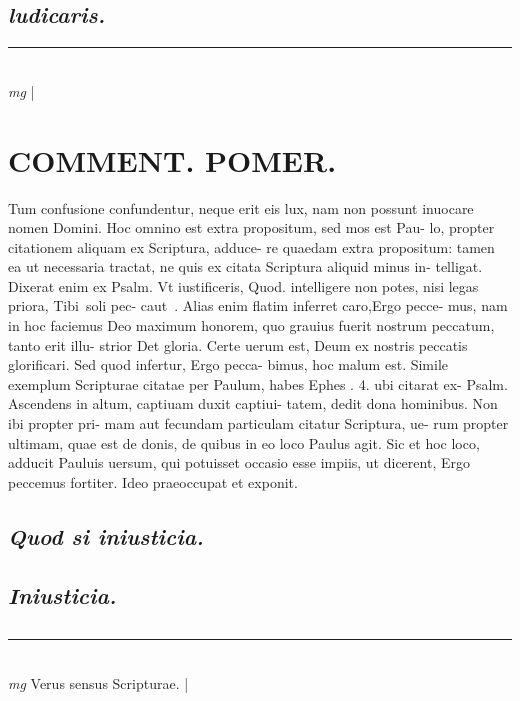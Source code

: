 \documentclass{article}
\begin{document}
\begin{pages}
\subsection*{\textit{ludicaris. }}\pstart  \pend
\vspace{0.5cm}\noindent
\vspace{0.2cm}\rule{1cm}{0.2pt}\\ 
\hspace{0.2cm}\textit{mg}
\footnotesize 
\normalsize| 
\section*{COMMENT. POMER.  }\pstart Tum confusione confundentur, neque erit eis lux, nam non possunt inuocare nomen Domini.  \pend\pstart Hoc omnino est extra propositum, sed mos est Pau- lo, propter citationem aliquam ex Scriptura, adduce- re quaedam extra propositum: tamen ea ut necessaria tractat, ne quis ex citata Scriptura aliquid minus in- telligat. Dixerat enim ex Psalm. Vt iustificeris, Quod. intelligere non potes, nisi legas priora, Tibi soli pec- caut . Alias enim flatim inferret caro,Ergo pecce- mus, nam in hoc faciemus Deo maximum honorem, quo grauius fuerit nostrum peccatum, tanto erit illu- strior Det gloria. Certe uerum est, Deum ex nostris peccatis glorificari. Sed quod infertur, Ergo pecca- bimus, hoc malum est. Simile exemplum Scripturae citatae per Paulum, habes Ephes . 4. ubi citarat ex- Psalm. Ascendens in altum, captiuam duxit captiui- tatem, dedit dona hominibus. Non ibi propter pri- mam aut fecundam particulam citatur Scriptura, ue- rum propter ultimam, quae est de donis, de quibus in eo loco Paulus agit. Sic et hoc loco, adducit Pauluis uersum, qui potuisset occasio esse impiis, ut dicerent, Ergo peccemus fortiter. Ideo praeoccupat et exponit.   \pend
{}
{}
\subsection*{\textit{Quod si iniusticia. }}
{}
\subsection*{\textit{Iniusticia. }}\pstart  \pend
{}
{}
\subsection*{\textit{}}\pstart  \pend
\vspace{0.5cm}\noindent
\vspace{0.2cm}\rule{1cm}{0.2pt}\\ 
\hspace{0.2cm}\textit{mg}
\footnotesize Verus sensus Scripturae.  
\normalsize| 

\end{pages}
\end{document}
